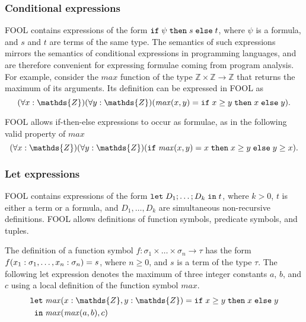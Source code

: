 \documentclass{easychair}
\begin{document}
\subsubsection*{Conditional expressions}
FOOL contains expressions of the form $\mathtt{if}\;{\psi}\;\allowbreak\mathtt{then}\;{s}\;\allowbreak\mathtt{else}\;{t}$, where $\psi$ is a
formula, and $s$ and $t$ are terms of the same type. 
The semantics of such expressions mirrors the semantics of conditional 
expressions in programming languages, and are therefore convenient for 
expressing formulae coming from program analysis. 
For example, consider the $\mathit{max}$ function of the type 
$\mathds{Z}\times\mathds{Z}\to\mathds{Z}$ that returns the maximum of its 
arguments. 
Its definition can be expressed in FOOL as
\begin{equation}\label{eq:ite-t-example}
(\forall x:\mathds{Z})(\forall y:\mathds{Z})
(\mathit{max}(x, y) = \ite{x \geq y}{x}{y}).
\end{equation}

FOOL allows if-then-else expressions to occur as formulae, as in the
following valid property of $\mathit{max}$
\begin{equation}\label{eq:ite-f-example}
(\forall x:\mathds{Z})(\forall y:\mathds{Z})
(\ite{\mathit{max}(x, y) = x}{x \geq y}{y \geq x}).
\end{equation}

\subsubsection*{Let expressions}
FOOL contains expressions of the form $\mathtt{let}\;{D_1;\ldots;D_k}\;\allowbreak\mathtt{in}\;{t}$, where
$k > 0$, $t$ is either a term or a formula, and $D_1,\ldots,D_k$ are
simultaneous non-recursive definitions. FOOL allows definitions of function
symbols, predicate symbols, and tuples.

The definition of a function symbol 
$f:\sigma_1\times\ldots\times\sigma_n\to\tau$ has the form 
${f(x_1:\sigma_1,\ldots,x_n:\sigma_n)}={s}$, where
$n \geq 0$, and $s$ is a term of the type $\tau$.
The following let expression denotes the maximum of three integer constants
$a$, $b$, and $c$ using a local definition of the function symbol
$\mathit{max}$.
\begin{equation}\label{eq:fool-let-impl}
\begin{aligned}
\mathtt{let}\;&\binding{\mathit{max}(x:\mathds{Z},y:\mathds{Z})}
                       {\ite{x \geq y}{x}{y}}\\
 \mathtt{in}\;&\mathit{max}(\mathit{max}(a,b),c)
\end{aligned}
\end{equation}
\end{document}
